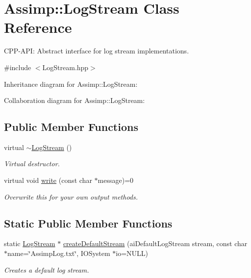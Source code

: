 \hypertarget{class_assimp_1_1_log_stream}{\section{Assimp\+:\+:Log\+Stream Class Reference}
\label{class_assimp_1_1_log_stream}
}


C\+P\+P-\/\+A\+P\+I\+: Abstract interface for log stream implementations.  




{\ttfamily \#include $<$Log\+Stream.\+hpp$>$}



Inheritance diagram for Assimp\+:\+:Log\+Stream\+:


Collaboration diagram for Assimp\+:\+:Log\+Stream\+:
\subsection*{Public Member Functions}
\begin{DoxyCompactItemize}
\item 
\hypertarget{class_assimp_1_1_log_stream_a72cabcadc78dcbdd54b5641703057ee7}{virtual \hyperlink{class_assimp_1_1_log_stream_a72cabcadc78dcbdd54b5641703057ee7}{$\sim$\+Log\+Stream} ()}\label{class_assimp_1_1_log_stream_a72cabcadc78dcbdd54b5641703057ee7}

\begin{DoxyCompactList}\small\item\em Virtual destructor. \end{DoxyCompactList}\item 
virtual void \hyperlink{class_assimp_1_1_log_stream_ab0bfcb5ab9988ef65d7222a50f6e8d37}{write} (const char $\ast$message)=0
\begin{DoxyCompactList}\small\item\em Overwrite this for your own output methods. \end{DoxyCompactList}\end{DoxyCompactItemize}
\subsection*{Static Public Member Functions}
\begin{DoxyCompactItemize}
\item 
static \hyperlink{class_assimp_1_1_log_stream}{Log\+Stream} $\ast$ \hyperlink{class_assimp_1_1_log_stream_af5188cac733b9a54a12b5b297a567e47}{create\+Default\+Stream} (ai\+Default\+Log\+Stream stream, const char $\ast$name=\char`\"{}Assimp\+Log.\+txt\char`\"{}, I\+O\+System $\ast$io=N\+U\+L\+L)
\begin{DoxyCompactList}\small\item\em Creates a default log stream. \end{DoxyCompactList}\end{DoxyCompactItemize}
